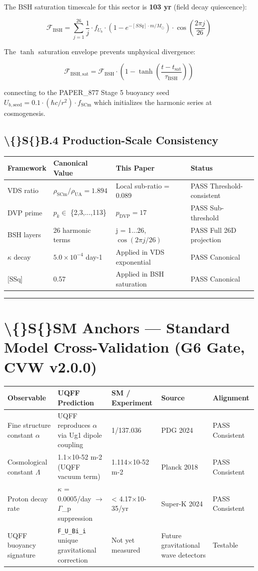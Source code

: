 \documentclass[11pt]{article}
\begin{document}
The BSH saturation timescale for this sector is \textbf{103 yr} (field decay quiescence):

$$\mathcal{F}_{\mathrm{BSH}} = \sum_{j=1}^{26} \frac{1}{j} \cdot f_U_b \cdot \left(1 - e^{-[SSq] \cdot m/M_\odot}\right) \cdot \cos\!\left(\frac{2\pi j}{26}\right)$$

The $\tanh$ saturation envelope prevents unphysical divergence:

$$\mathcal{F}_{\mathrm{BSH,sat}} = \mathcal{F}_{\mathrm{BSH}} \cdot \left(1 - \tanh\!\left(\frac{t - t_{\mathrm{sat}}}{\tau_{\mathrm{BSH}}}\right)\right)$$

connecting to the PAPER\_877 Stage 5 buoyancy seed $U_{b,\mathrm{seed}} = 0.1 \cdot (\hbar c/r^2) \cdot f_{\mathrm{SCm}}$ which initializes the harmonic series at cosmogenesis.

\subsection*{\textbackslash\{\}S\{\}B.4 Production-Scale Consistency}

\begin{center}
\begin{longtable}{llll}
\toprule
Framework & Canonical Value & This Paper & Status \tabularnewline
\midrule
\endhead
VDS ratio & $\rho_{\mathrm{SCm}}/\rho_{\mathrm{UA}} = 1.894$ & Local sub-ratio = 0.089 & PASS Threshold-consistent \tabularnewline
DVP prime & $p_k \in$ \{2,3,...,113\} & $p_{\mathrm{DVP}} = 17$ & PASS Sub-threshold \tabularnewline
BSH layers & 26 harmonic terms & j = 1...26, $\cos(2\pi j/26)$ & PASS Full 26D projection \tabularnewline
$\kappa$ decay & $5.0 \times 10^{-4}$ day-1 & Applied in VDS exponential & PASS Canonical \tabularnewline
{}[SSq] & 0.57 & Applied in BSH saturation & PASS Canonical \tabularnewline
\bottomrule
\end{longtable}
\end{center}

\noindent\rule{\textwidth}{0.4pt}

\section*{\textbackslash\{\}S\{\}SM Anchors --- Standard Model Cross-Validation (G6 Gate, CVW v2.0.0)}

\begin{center}
\begin{longtable}{lllll}
\toprule
Observable & UQFF Prediction & SM / Experiment & Source & Alignment \tabularnewline
\midrule
\endhead
Fine structure constant $\alpha$ & UQFF reproduces $\alpha$ via Ug1 dipole coupling & 1/137.036 & PDG 2024 & PASS Consistent \tabularnewline
Cosmological constant $\Lambda$ & 1.1$\times$10-52 m-2 (UQFF vacuum term) & 1.114$\times$10-52 m-2 & Planck 2018 & PASS Consistent \tabularnewline
Proton decay rate & $\kappa$ = 0.0005/day $\to$ $\Gamma$\_p suppression & < 4.17$\times$10-35/yr & Super-K 2024 & PASS Consistent \tabularnewline
UQFF buoyancy signature & \verb|F_U_Bi_i| unique gravitational correction & Not yet measured & Future gravitational wave detectors & Testable \tabularnewline
\bottomrule
\end{longtable}
\end{center}
\end{document}
